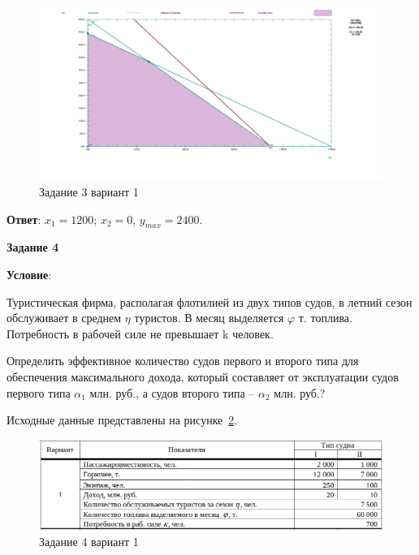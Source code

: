 \begin{figure}[!htb]
  \centering

  \includegraphics[width=18cm]
  {inc/result3_option1.png}

  \caption{Задание 3 вариант 1}
  \label{fig:result3_option1}
\end{figure}

\textbf{Ответ}: $x_1 = 1200$; $x_2 = 0$, $y_{max} = 2400$.

\newpage

\begin{center}
  \textbf{Задание 4}
\end{center}

\textbf{Условие}:

Туристическая фирма, располагая флотилией из двух типов судов,
в летний сезон обслуживает в среднем $\eta$ туристов.
В месяц выделяется $\varphi$ т. топлива.
Потребность в рабочей силе не превышает k человек.

Определить эффективное количество судов первого и второго типа для обеспечения максимального дохода,
который составляет от эксплуатации судов первого типа $\alpha_1$ млн. руб.,
а судов второго типа – $\alpha_2$ млн. руб.?

Исходные данные представлены на рисунке~\ref{fig:task4_1}.

\begin{figure}[!htb]
  \centering

  \includegraphics[width=16cm]
  {inc/task4_1.png}

  \caption{Задание 4 вариант 1}
  \label{fig:task4_1}
\end{figure}

